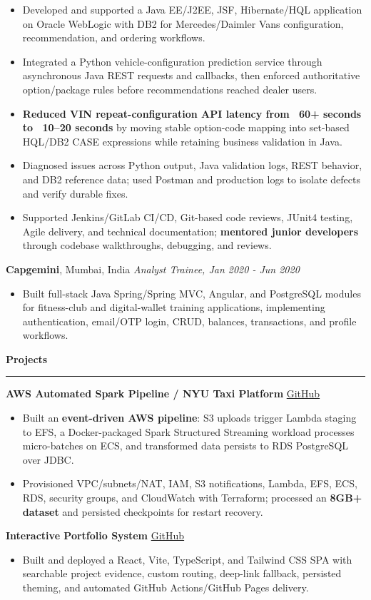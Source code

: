 \documentclass[11pt,letterpaper]{article}
\newcommand{\ressection}[1]{\Needspace{6\baselineskip}\vspace{8pt}\par\textbf{#1}\par\vspace{2pt}\hrule\vspace{5pt}}
\begin{document}
\begin{itemize}
  \item Developed and supported a Java EE/J2EE, JSF, Hibernate/HQL application on Oracle WebLogic with DB2 for Mercedes/Daimler Vans configuration, recommendation, and ordering workflows.
  \item Integrated a Python vehicle-configuration prediction service through asynchronous Java REST requests and callbacks, then enforced authoritative option/package rules before recommendations reached dealer users.
  \item \textbf{Reduced VIN repeat-configuration API latency from ~60+ seconds to ~10--20 seconds} by moving stable option-code mapping into set-based HQL/DB2 CASE expressions while retaining business validation in Java.
  \item Diagnosed issues across Python output, Java validation logs, REST behavior, and DB2 reference data; used Postman and production logs to isolate defects and verify durable fixes.
  \item Supported Jenkins/GitLab CI/CD, Git-based code reviews, JUnit4 testing, Agile delivery, and technical documentation; \textbf{mentored junior developers} through codebase walkthroughs, debugging, and reviews.
\end{itemize}
\textbf{Capgemini}, Mumbai, India \hfill \textit{Analyst Trainee, Jan 2020 - Jun 2020}
\begin{itemize}
  \item Built full-stack Java Spring/Spring MVC, Angular, and PostgreSQL modules for fitness-club and digital-wallet training applications, implementing authentication, email/OTP login, CRUD, balances, transactions, and profile workflows.
\end{itemize}

\ressection{Projects}
\textbf{AWS Automated Spark Pipeline / NYU Taxi Platform} \hfill \href{https://github.com/preferablehuman/AWS-automated-spark-pipeline}{GitHub}
\begin{itemize}
  \item Built an \textbf{event-driven AWS pipeline}: S3 uploads trigger Lambda staging to EFS, a Docker-packaged Spark Structured Streaming workload processes micro-batches on ECS, and transformed data persists to RDS PostgreSQL over JDBC.
  \item Provisioned VPC/subnets/NAT, IAM, S3 notifications, Lambda, EFS, ECS, RDS, security groups, and CloudWatch with Terraform; processed an \textbf{8GB+ dataset} and persisted checkpoints for restart recovery.
\end{itemize}
\vspace{2pt}
\textbf{Interactive Portfolio System} \hfill \href{https://github.com/preferablehuman/portfolio}{GitHub}
\begin{itemize}
  \item Built and deployed a React, Vite, TypeScript, and Tailwind CSS SPA with searchable project evidence, custom routing, deep-link fallback, persisted theming, and automated GitHub Actions/GitHub Pages delivery.
\end{itemize}
\end{document}
